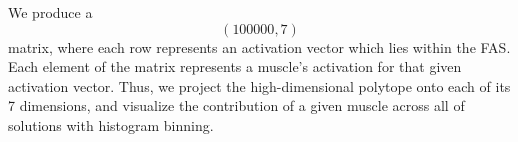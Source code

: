 \begin{results}

We produce a $$(100000,7)$$ matrix, where each row represents an activation vector which lies within the FAS. Each element of the matrix represents a muscle's activation for that given activation vector. Thus, we project the high-dimensional polytope onto each of its 7 dimensions, and visualize the contribution of a given muscle across all of solutions with histogram binning.



\end{results}